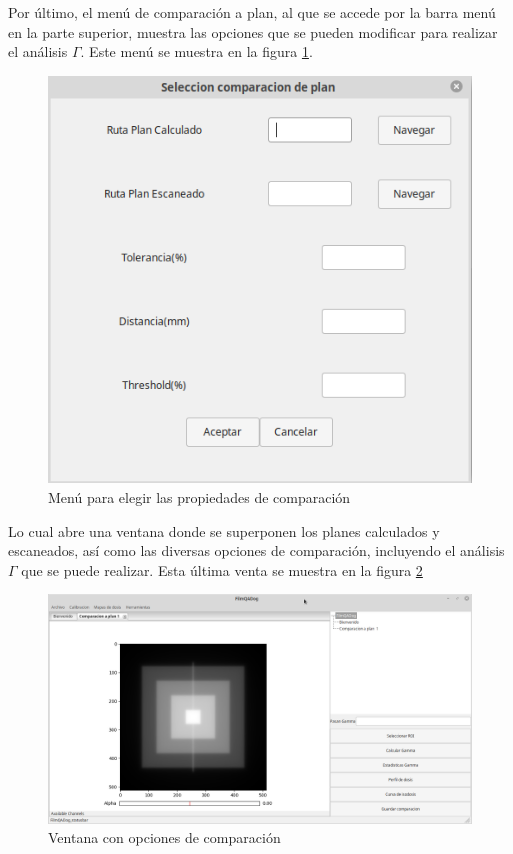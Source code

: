 Por último, el menú de comparación a plan, al que se accede por la barra menú en la parte superior, muestra las opciones que se pueden modificar para realizar el análisis $\Gamma$. Este menú se muestra en la figura \ref{fig:menuComparacion}.

\begin{figure}[H]
	\centering
	\includegraphics[width=0.7\linewidth]{images/imagenesDocumentacion/menuComparacionAplan.png}
	\caption{Menú para elegir las propiedades de comparación }
	\label{fig:menuComparacion}
\end{figure}

Lo cual abre una ventana donde se superponen los planes calculados y escaneados, así como las diversas opciones de comparación, incluyendo el análisis $\Gamma$ que se puede realizar. Esta última venta se muestra en la figura \ref{fig:ventanaComparacion}

\begin{figure}[H]
	\centering
	\includegraphics[width=0.7\linewidth]{images/imagenesDocumentacion/ventanaComparacioAPlan.png}
	\caption{Ventana con opciones de comparación }
	\label{fig:ventanaComparacion}
\end{figure}


